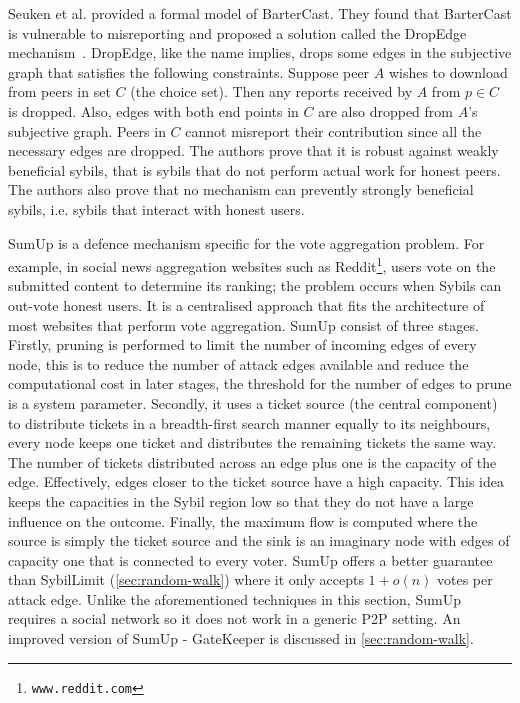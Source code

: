 Seuken et al. provided a formal model of BarterCast. They found that BarterCast
is vulnerable to misreporting and proposed a solution called the DropEdge
mechanism~\cite{seuken2011sybil, seuken2014sybil}. DropEdge, like the name
implies, drops some edges in the subjective graph that satisfies the following
constraints. Suppose peer $A$ wishes to download from peers in set $C$ (the
choice set). Then any reports received by $A$ from $p \in C$ is dropped. Also,
edges with both end points in $C$ are also dropped from $A$'s subjective graph.
Peers in $C$ cannot misreport their contribution since all the necessary edges
are dropped. The authors prove that it is robust against weakly beneficial
sybils, that is sybils that do not perform actual work for honest peers. The
authors also prove that no mechanism can prevently strongly beneficial sybils,
i.e. sybils that interact with honest users.

SumUp\cite{tran2009sybil} is a defence mechanism specific for the vote
aggregation problem. For example, in social news aggregation websites such as
Reddit\footnote{\texttt{www.reddit.com}}, users vote on the submitted content to
determine its ranking; the problem occurs when Sybils can out-vote honest users.
It is a centralised approach that fits the architecture of most websites that
perform vote aggregation. SumUp consist of three stages. Firstly, pruning is
performed to limit the number of incoming edges of every node, this is to reduce
the number of attack edges available and reduce the computational cost in later
stages, the threshold for the number of edges to prune is a system parameter.
Secondly, it uses a ticket source (the central component) to distribute tickets
in a breadth-first search manner equally to its neighbours, every node keeps one
ticket and distributes the remaining tickets the same way. The number of tickets
distributed across an edge plus one is the capacity of the edge. Effectively,
edges closer to the ticket source have a high capacity. This idea keeps the
capacities in the Sybil region low so that they do not have a large influence on
the outcome. Finally, the maximum flow is computed where the source is simply
the ticket source and the sink is an imaginary node with edges of capacity one
that is connected to every voter. SumUp offers a better guarantee than
SybilLimit (\autoref{sec:random-walk}) where it only accepts $1 + o(n)$ votes
per attack edge. Unlike the aforementioned techniques in this section,
SumUp requires a social network so it does not work in a generic P2P setting. An
improved version of SumUp - GateKeeper is discussed in
\autoref{sec:random-walk}.

